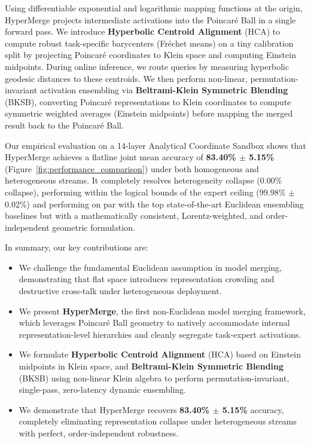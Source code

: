 Using differentiable exponential and logarithmic mapping functions at the origin, HyperMerge projects intermediate activations into the Poincaré Ball in a single forward pass. We introduce \textbf{Hyperbolic Centroid Alignment} (HCA) to compute robust task-specific barycenters (Fréchet means) on a tiny calibration split by projecting Poincaré coordinates to Klein space and computing Einstein midpoints. During online inference, we route queries by measuring hyperbolic geodesic distances to these centroids. We then perform non-linear, permutation-invariant activation ensembling via \textbf{Beltrami-Klein Symmetric Blending} (BKSB), converting Poincaré representations to Klein coordinates to compute symmetric weighted averages (Einstein midpoints) before mapping the merged result back to the Poincaré Ball.

Our empirical evaluation on a 14-layer Analytical Coordinate Sandbox shows that HyperMerge achieves a flatline joint mean accuracy of \textbf{83.40\% $\pm$ 5.15\%} (Figure~\ref{fig:performance_comparison}) under both homogeneous and heterogeneous streams. It completely resolves heterogeneity collapse (0.00\% collapse), performing within the logical bounds of the expert ceiling (99.98\% $\pm$ 0.02\%) and performing on par with the top state-of-the-art Euclidean ensembling baselines but with a mathematically consistent, Lorentz-weighted, and order-independent geometric formulation. 

In summary, our key contributions are:
\begin{itemize}
    \item We challenge the fundamental Euclidean assumption in model merging, demonstrating that flat space introduces representation crowding and destructive cross-talk under heterogeneous deployment.
    \item We present \textbf{HyperMerge}, the first non-Euclidean model merging framework, which leverages Poincaré Ball geometry to natively accommodate internal representation-level hierarchies and cleanly segregate task-expert activations.
    \item We formulate \textbf{Hyperbolic Centroid Alignment} (HCA) based on Einstein midpoints in Klein space, and \textbf{Beltrami-Klein Symmetric Blending} (BKSB) using non-linear Klein algebra to perform permutation-invariant, single-pass, zero-latency dynamic ensembling.
    \item We demonstrate that HyperMerge recovers \textbf{83.40\% $\pm$ 5.15\%} accuracy, completely eliminating representation collapse under heterogeneous streams with perfect, order-independent robustness.
\end{itemize}
